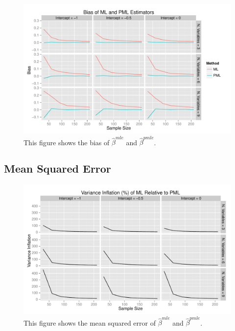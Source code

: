 \documentclass[12pt]{article}
\begin{document}
\begin{appendix}
\begin{figure}[H]
\begin{center}
\includegraphics[width = \textwidth]{figs/sims-bias.pdf}
\caption{This figure shows the bias of $\hat{\beta}^{mle}$ and $\hat{\beta}^{pmle}$.}\label{fig:bias}
\end{center}
\end{figure}

\subsection{Mean Squared Error}

\begin{figure}[H]
\begin{center}
\includegraphics[width = \textwidth]{figs/sims-var-infl.pdf}
\caption{This figure shows the mean squared error of $\hat{\beta}^{mle}$ and $\hat{\beta}^{pmle}$.}\label{fig:mse}
\end{center}
\end{figure}


\end{appendix}
\end{document}
